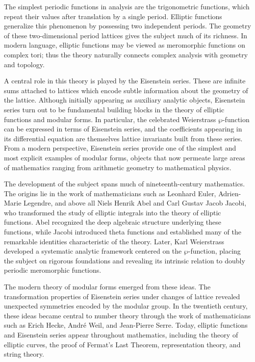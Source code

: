 \documentclass[12pt,reqno]{amsart}
\theoremstyle{plain}
\numberwithin{equation}{section}
\begin{document}
The simplest periodic functions in analysis are the trigonometric functions, which repeat their values after translation by a single period.  Elliptic functions generalize this phenomenon by possessing two independent periods. The geometry of these two-dimensional period lattices gives the subject much of its richness. In modern language, elliptic functions may be viewed as meromorphic functions on complex tori; thus the theory naturally connects complex analysis with geometry and topology.

A central role in this theory is played by the Eisenstein series. These are infinite sums attached to lattices which encode subtle information about the geometry of the lattice. Although initially appearing as auxiliary analytic objects, Eisenstein series turn out to be fundamental building blocks in the theory of elliptic functions and modular forms. In particular, the celebrated Weierstrass $\wp$-function can be expressed in terms of Eisenstein series, and the coefficients appearing in its differential equation are themselves lattice invariants built from these series. From a modern perspective, Eisenstein series provide one of the simplest and most explicit examples of modular forms, objects that now permeate large areas of mathematics ranging from arithmetic geometry to mathematical physics.

The development of the subject spans much of nineteenth-century mathematics. The origins lie in the work of mathematicians such as Leonhard Euler, Adrien-Marie Legendre, and above all Niels Henrik Abel and Carl Gustav Jacob Jacobi, who transformed the study of elliptic integrals into the theory of elliptic functions. Abel recognized the deep algebraic structure underlying these functions, while Jacobi introduced theta functions and established many of the remarkable identities characteristic of the theory. Later, Karl Weierstrass developed a systematic analytic framework centered on the $\wp$-function, placing the subject on rigorous foundations and revealing its intrinsic relation to doubly periodic meromorphic functions.

The modern theory of modular forms emerged from these ideas. The transformation properties of Eisenstein series under changes of lattice revealed unexpected symmetries encoded by the modular group. In the twentieth century, these ideas became central to number theory through the work of mathematicians such as Erich Hecke, Andr\'e Weil, and Jean-Pierre Serre. Today, elliptic functions and Eisenstein series appear throughout mathematics, including the theory of elliptic curves, the proof of Fermat's Last Theorem, representation theory, and string theory.
\end{document}
